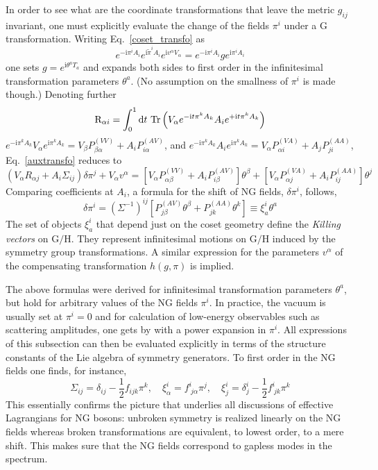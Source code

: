 \documentclass[final,3p,times,12pt,a4paper,sort&compress]{elsarticle}
\newcommand\gr[1]{\mathrm{#1}}              %
\newcommand\R{\gr{R}}
\newcommand\imag{\mathrm i}                 %
\newcommand\vt{\theta}
\newcommand\dd{\mathop{{\rm d}\!}\nolimits} %
\DeclareMathOperator{\Tr}{Tr}
\begin{document}
In order to see what are the coordinate transformations that leave the metric
$g_{ij}$ invariant, one must explicitly evaluate the change of the fields
$\pi^i$ under a $\gr G$ transformation. Writing Eq.~\eqref{coset_transfo} as
\begin{equation}
e^{-\imag\pi^iA_i}e^{\imag\tilde\pi^iA_i}e^{\imag v^\alpha V_\alpha}=
e^{-\imag\pi^iA_i}ge^{\imag\pi^iA_i}
\label{auxtransfo}
\end{equation}
one sets $g=e^{\imag\vt^aT_a}$ and expands both sides to first order in the
infinitesimal transformation parameters $\vt^a$. (No assumption on the
smallness of $\pi^i$ is made though.) Denoting further
\begin{equation}
\R_{\alpha i}=\int_0^1\dd t\,\Tr\left(V_\alpha e^{-\imag t\pi^kA_k}A_i
e^{+\imag t\pi^kA_k}\right)
\end{equation}
$e^{-\imag\pi^kA_k}V_\alpha e^{\imag\pi^kA_k}=V_\beta P^{(VV)}_{\beta\alpha}+
A_iP^{(AV)}_{i\alpha}$, and $e^{-\imag\pi^kA_k}A_i
e^{\imag\pi^kA_k}=V_\alpha P^{(VA)}_{\alpha i}+A_jP^{(AA)}_{ji}$,
Eq.~\eqref{auxtransfo} reduces to
\begin{equation}
(V_\alpha R_{\alpha j}+A_i\Sigma_{ij})\delta\pi^j+V_\alpha v^\alpha=
\left[V_\alpha P^{(VV)}_{\alpha\beta}+A_iP^{(AV)}_{i\beta}\right]\vt^\beta+
\left[V_\alpha P^{(VA)}_{\alpha j}+A_iP^{(AA)}_{ij}\right]\vt^j
\label{master_pi}
\end{equation}
Comparing coefficients at $A_i$, a formula for the shift of NG fields,
$\delta\pi^i$, follows,
\begin{equation}
\delta\pi^i=(\Sigma^{-1})^{ij}\left[P^{(AV)}_{j\beta}\vt^\beta+P^{(AA)}_{jk}\vt^k\right]
\equiv\xi^i_{a}\vt^a
\label{killing}
\end{equation}
The set of objects $\xi^i_a$ that depend just on the coset geometry define the
\emph{Killing vectors} on $\gr{G/H}$. They represent infinitesimal motions on
$\gr{G/H}$ induced by the symmetry group transformations. A similar
expression for the parameters $v^\alpha$ of the compensating transformation
$h(g,\pi)$ is implied.

The above formulas were derived for infinitesimal transformation parameters
$\vt^a$, but hold for arbitrary values of the NG fields $\pi^i$. In practice,
the vacuum is usually set at $\pi^i=0$ and for calculation of low-energy
observables such as scattering amplitudes, one gets by with a power expansion
in $\pi^i$. All expressions of this subsection can then be evaluated explicitly
in terms of the structure constants of the Lie algebra of symmetry generators.
To first order in the NG fields one finds, for instance,
\begin{equation}
\Sigma_{ij}=\delta_{ij}-\frac12f_{ijk}\pi^k,\quad
\xi^i_\alpha=f^i_{\ j\alpha}\pi^j,\quad
\xi^i_j=\delta^i_j-\frac12f^i_{\ jk}\pi^k
\end{equation}
This essentially confirms the picture that underlies all discussions of
effective Lagrangians for NG bosons: unbroken symmetry is realized linearly on
the NG fields whereas broken transformations are equivalent, to lowest order,
to a mere shift. This makes sure that the NG fields correspond to gapless modes
in the spectrum.
\end{document}
